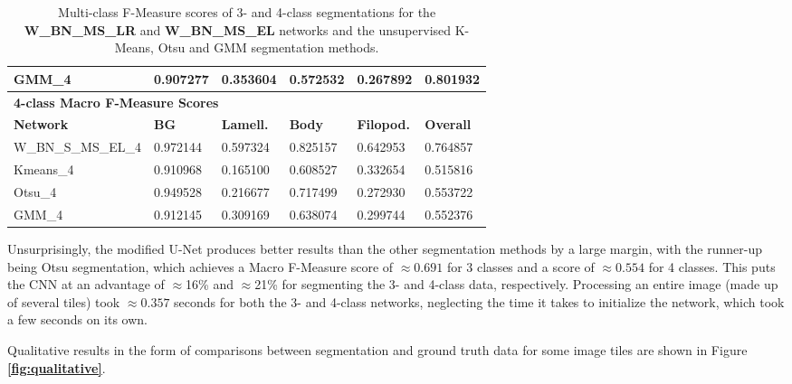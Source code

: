 \begin {table}
\begin{flushleft}
\begin {tabular}[!htb]{|l|l|l|l|l|l|}
			GMM\_4& 0.907277& 0.353604& 0.572532& 0.267892& 0.801932 \\ \hline
			\multicolumn{6}{|l|}{\textbf{4-class Macro F-Measure Scores}} \\ \hline
			\textbf{Network}& \textbf{BG}& \textbf{Lamell.}& \textbf{Body}& \textbf{Filopod.}& \textbf{Overall} \\ \hline
			W\_BN\_S\_MS\_EL\_4& \cellcolor{green!25}0.972144& \cellcolor{green!25}0.597324& \cellcolor{green!25}0.825157& \cellcolor{green!25}0.642953& \cellcolor{green!25}0.764857 \\ \hline
			Kmeans\_4& 0.910968& 0.165100& 0.608527& 0.332654& 0.515816 \\ \hline
			Otsu\_4& 0.949528& 0.216677& 0.717499& 0.272930& 0.553722 \\ \hline
			GMM\_4& 0.912145& 0.309169& 0.638074& 0.299744& 0.552376 \\ \hline
		\end {tabular}
	\end {flushleft}
\caption[Multi-class F-Measure scores for final network and other image segmentation methods.]{Multi-class F-Measure scores of 3- and 4-class segmentations for the \textbf{W\_BN\_MS\_LR} and \textbf{W\_BN\_MS\_EL} networks and the unsupervised K-Means, Otsu and GMM segmentation methods.}
\label{tab:resultsfinal}
\end {table}

Unsurprisingly, the modified U-Net produces better results than the other segmentation methods by a large margin, with the runner-up being Otsu segmentation, which achieves a Macro F-Measure score of $\approx0.691$ for 3 classes and a score of $\approx0.554$ for 4 classes. This puts the CNN at an advantage of $\approx$16\% and $\approx$21\% for segmenting the 3- and 4-class data, respectively. Processing an entire image (made up of several tiles) took $\approx0.357$ seconds for both the 3- and 4-class networks, neglecting the time it takes to initialize the network, which took a few seconds on its own.

Qualitative results in the form of comparisons between segmentation and ground truth data for some image tiles are shown in Figure \textbf{\ref{fig:qualitative}}.


